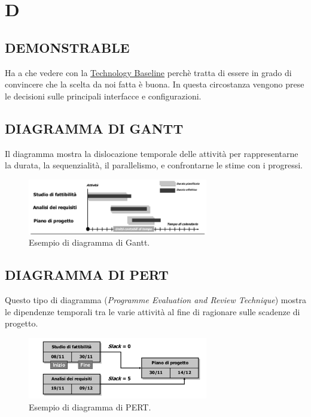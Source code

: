 \newpage
	\section{D} \label{sec:D}

		\subsection{DEMONSTRABLE}		\label{demonstrable}
		Ha  a che vedere con la \underline{\hyperref[technologybaseline]{Technology Baseline}} perchè tratta di essere in grado di convincere che la scelta da noi fatta è buona. In questa circostanza vengono prese le decisioni sulle principali interfacce e configurazioni.

		\subsection{DIAGRAMMA DI GANTT}  \label{gantt}
		Il diagramma mostra la dislocazione temporale delle attività per rappresentarne la durata, la sequenzialità, il parallelismo, e confrontarne le stime con i progressi.

		\begin{figure}[H]
			\centering
			\includegraphics[width=0.7\textwidth]{img/gantt}
			\caption{Esempio di diagramma di Gantt.}
		\end{figure}

		\subsection{DIAGRAMMA DI PERT}  \label{pert}
		Questo tipo di diagramma (\textit{Programme Evaluation and Review Technique}) mostra le dipendenze temporali tra le varie attività al fine di ragionare sulle scadenze di progetto.

		\begin{figure}[H]
			\centering
			\includegraphics[width=0.7\textwidth]{img/pert}
			\caption{Esempio di diagramma di PERT.}
		\end{figure}

